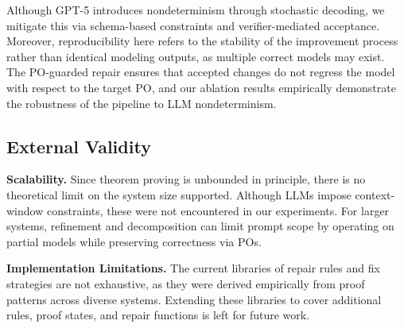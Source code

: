 Although GPT-5 introduces nondeterminism through stochastic decoding, we mitigate this via schema-based constraints and verifier-mediated acceptance.
Moreover, reproducibility here refers to the stability of the improvement process rather than identical modeling outputs, as multiple correct models may exist.
The PO-guarded repair ensures that accepted changes do not regress the model with respect to the target PO, and our ablation results empirically demonstrate the robustness of the pipeline to LLM nondeterminism.


\subsection{External Validity}
\noindent \textbf{Scalability.}
Since theorem proving is unbounded in principle, there is no theoretical limit on the system size supported.
Although LLMs impose context-window constraints, these were not encountered in our experiments.
For larger systems, refinement and decomposition can limit prompt scope by operating on partial models while preserving correctness via POs.


\noindent\textbf{Implementation Limitations.}
The current libraries of repair rules and fix strategies are not exhaustive, as they were derived empirically from proof patterns across diverse systems.
Extending these libraries to cover additional rules, proof states, and repair functions is left for future work.





